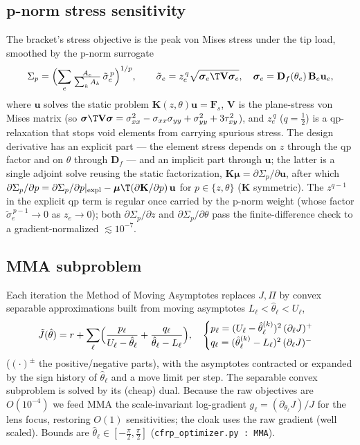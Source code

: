 \documentclass[11pt]{article}
\begin{document}
\subsection{p-norm stress sensitivity}
\label{app:stresssens}
The bracket's stress objective is the peak von Mises stress under the tip load,
smoothed by the p-norm surrogate
\begin{equation}
  \Sigma_p=\Bigl(\sum_e \tfrac{A_e}{\sum_k A_k}\,\tilde\sigma_e^{\,p}\Bigr)^{1/p},
  \qquad
  \tilde\sigma_e=z_e^{\,q}\sqrt{\bm\sigma_e\T\mathbf V\bm\sigma_e},\quad
  \bm\sigma_e=\mathbf D_f(\theta_e)\,\mathbf B_e\mathbf u_e ,
\end{equation}
where $\mathbf u$ solves the static problem $\mathbf K(z,\theta)\mathbf u=\mathbf F_s$,
$\mathbf V$ is the plane-stress von Mises matrix (so
$\bm\sigma\T\mathbf V\bm\sigma=\sigma_{xx}^2-\sigma_{xx}\sigma_{yy}+\sigma_{yy}^2
+3\tau_{xy}^2$), and $z_e^{\,q}$ ($q=\tfrac12$) is a qp-relaxation that stops void
elements from carrying spurious stress. The design derivative has an explicit part ---
the element stress depends on $z$ through the qp factor and on $\theta$ through
$\mathbf D_f$ --- and an implicit part through $\mathbf u$; the latter is a single
adjoint solve reusing the static factorization,
$\mathbf K\bm\mu=\partial\Sigma_p/\partial\mathbf u$, after which
$\partial\Sigma_p/\partial p=\partial\Sigma_p/\partial p|_{\rm expl}
-\bm\mu\T(\partial\mathbf K/\partial p)\,\mathbf u$ for $p\in\{z,\theta\}$
($\mathbf K$ symmetric). The $z^{q-1}$ in the explicit qp term is regular once carried
by the p-norm weight (whose factor $\tilde\sigma_e^{\,p-1}\!\to0$ as $z_e\to0$); both
$\partial\Sigma_p/\partial z$ and $\partial\Sigma_p/\partial\theta$ pass the
finite-difference check to a gradient-normalized $\lesssim10^{-7}$.

\subsection{MMA subproblem}
Each iteration the Method of Moving Asymptotes replaces $J,\Pi$ by convex
separable approximations built from moving asymptotes $L_\ell<\hat\theta_\ell<U_\ell$,
\begin{equation}
  \tilde J(\hat\theta)=r+\sum_\ell\Bigl(\frac{p_\ell}{U_\ell-\hat\theta_\ell}
  +\frac{q_\ell}{\hat\theta_\ell-L_\ell}\Bigr),\quad
  \begin{cases} p_\ell=(U_\ell-\hat\theta_\ell^{(k)})^2\,(\partial_\ell J)^+\\
  q_\ell=(\hat\theta_\ell^{(k)}-L_\ell)^2\,(\partial_\ell J)^-\end{cases}
\end{equation}
($(\cdot)^\pm$ the positive/negative parts), with the asymptotes contracted or
expanded by the sign history of $\hat\theta_\ell$ and a move limit per step. The
separable convex subproblem is solved by its (cheap) dual. Because the raw
objectives are $O(10^{-4})$ we feed MMA the scale-invariant log-gradient
$g_\ell=(\partial_{\theta_\ell}J)/J$ for the lens focus, restoring $O(1)$
sensitivities; the cloak uses the raw gradient (well scaled). Bounds are
$\hat\theta_\ell\in[-\tfrac\pi2,\tfrac\pi2]$ (\texttt{cfrp\_optimizer.py : MMA}).
\end{document}
